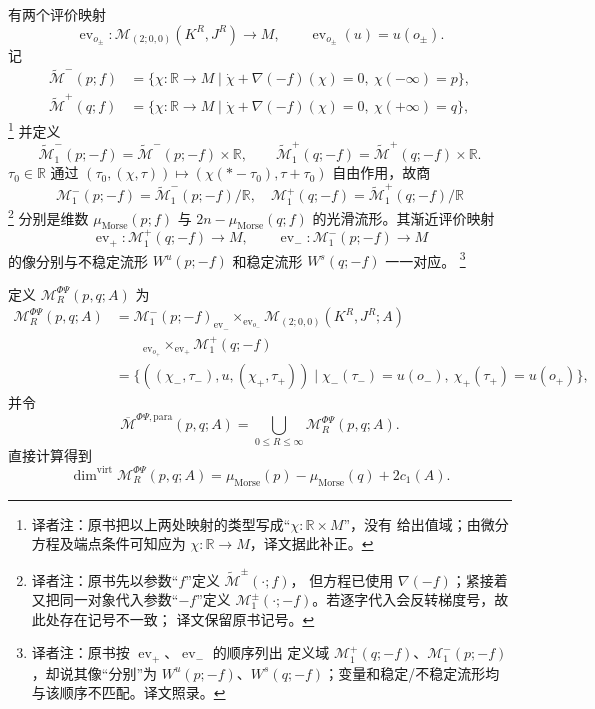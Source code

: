 有两个评价映射
\[
 \operatorname{ev}_{o_\pm}:\mathcal M_{(2;0,0)}(K^R,J^R)\to M,
 \qquad\operatorname{ev}_{o_\pm}(u)=u(o_\pm).
\]
记
\[
 \begin{aligned}
 \widetilde{\mathcal M}^-(p;f)
 &=\{\chi:\mathbb R\to M\mid\dot\chi+\nabla(-f)(\chi)=0,
 \ \chi(-\infty)=p\},\\
\widetilde{\mathcal M}^+(q;f)
&=\{\chi:\mathbb R\to M\mid\dot\chi+\nabla(-f)(\chi)=0,
 \ \chi(+\infty)=q\},
\end{aligned}
\]
\footnote{译者注：原书把以上两处映射的类型写成“$\chi:\mathbb R\times M$”，没有
给出值域；由微分方程及端点条件可知应为 $\chi:\mathbb R\to M$，译文据此补正。}
并定义
\[
 \widetilde{\mathcal M}_1^-(p;-f)=\widetilde{\mathcal M}^-(p;-f)\times\mathbb R,
 \qquad
 \widetilde{\mathcal M}_1^+(q;-f)=\widetilde{\mathcal M}^+(q;-f)\times\mathbb R.
\]
$\tau_0\in\mathbb R$ 通过
$(\tau_0,(\chi,\tau))\mapsto(\chi(*-\tau_0),\tau+\tau_0)$ 自由作用，故商
\[
 \mathcal M_1^-(p;-f)=\widetilde{\mathcal M}_1^-(p;-f)/\mathbb R,
 \quad
 \mathcal M_1^+(q;-f)=\widetilde{\mathcal M}_1^+(q;-f)/\mathbb R
\]
\footnote{译者注：原书先以参数“$f$”定义 $\widetilde{\mathcal M}^{\pm}(\cdot;f)$，
但方程已使用 $\nabla(-f)$；紧接着又把同一对象代入参数“$-f$”定义
$\mathcal M_1^{\pm}(\cdot;-f)$。若逐字代入会反转梯度号，故此处存在记号不一致；
译文保留原书记号。}
分别是维数 $\mu_{\mathrm{Morse}}(p;f)$ 与
$2n-\mu_{\mathrm{Morse}}(q;f)$ 的光滑流形。其渐近评价映射
\[
 \operatorname{ev}_+:\mathcal M_1^+(q;-f)\to M,
 \qquad \operatorname{ev}_-:\mathcal M_1^-(p;-f)\to M
\]
的像分别与不稳定流形 $W^u(p;-f)$ 和稳定流形 $W^s(q;-f)$ 一一对应。
\footnote{译者注：原书按 $\operatorname{ev}_+$、$\operatorname{ev}_-$ 的顺序列出
定义域 $\mathcal M_1^+(q;-f)$、$\mathcal M_1^-(p;-f)$，却说其像“分别”为
$W^u(p;-f)$、$W^s(q;-f)$；变量和稳定/不稳定流形均与该顺序不匹配。译文照录。}

定义 $\mathcal M_R^{\Phi\Psi}(p,q;A)$ 为\termFiberProduct{}
\[
 \begin{aligned}
 \mathcal M_R^{\Phi\Psi}(p,q;A)
 &=\mathcal M_1^-(p;-f)_{\operatorname{ev}_-}
 \times_{\operatorname{ev}_{o_-}}\mathcal M_{(2;0,0)}(K^R,J^R;A)\\
 &\qquad{}_{\operatorname{ev}_{o_+}}
 \times_{\operatorname{ev}_+}\mathcal M_1^+(q;-f)\\
 &=\{((\chi_-,\tau_-),u,(\chi_+,\tau_+))\mid
 \chi_-(\tau_-)=u(o_-),\ \chi_+(\tau_+)=u(o_+)\},
 \end{aligned}
\]
并令
\[
 \overline{\mathcal M}^{\Phi\Psi,\mathrm{para}}(p,q;A)
 =\bigcup_{0\leq R\leq\infty}\mathcal M_R^{\Phi\Psi}(p,q;A).
\]
直接计算得到
\[
 \dim^{\mathrm{virt}}\mathcal M_R^{\Phi\Psi}(p,q;A)
 =\mu_{\mathrm{Morse}}(p)-\mu_{\mathrm{Morse}}(q)+2c_1(A).
\]

